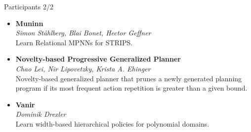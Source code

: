 \documentclass[aspectratio=169,xcolor=dvipsnames]{beamer}
\begin{document}
\begin{frame}{Participants 2/2}
\begin{itemize}
\item
    \textbf{Muninn}\\
    \emph{Simon Ståhlberg, Blai Bonet, Hector Geffner}\\
    Learn Relational MPNNs for STRIPS.
\item
    \textbf{Novelty-based Progressive Generalized Planner}\\
    \emph{Chao Lei, Nir Lipovetzky, Krista A. Ehinger}\\
    Novelty-based generalized planner that
    prunes a newly generated planning program if its most frequent action
    repetition is greater than a given bound.
\item
    \textbf{Vanir}\\
    \emph{Dominik Drexler}\\
    Learn width-based hierarchical policies for
    polynomial domains.
\end{itemize}
\end{frame}
\end{document}
